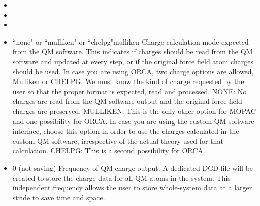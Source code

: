 \begin{itemize}
\item
{}

\item
{}

\item
{}

\item
{}%
{``none" or ``mulliken" or ``chelpg"}{mulliken}{%
Charge calculation mode expected from the QM software. This
indicates if charges should be read from the QM software and
updated at every step, or if the original force field atom
charges should be used. In case you are using ORCA, two charge
options are allowed, Mulliken or CHELPG. We must know the kind
of charge requested by the user so that the proper format is expected,
read and processed. NONE: No charges are read from the QM software
output and the original force field charges are preserved.
MULLIKEN: This is the only other option for MOPAC and one possibility
for ORCA. In case you are using the custom QM software interface,
choose this option in order to use the charges calculated in the
custom QM software, irrespective of the actual theory used for
that calculation. CHELPG: This is a second possibility for ORCA.
}

\item
{}%
{0 (not saving)}{%
Frequency of QM charge output. A dedicated DCD file will be created
to store the charge data for all QM atoms in the system. This
independent frequency allows the user to store whole-system data
at a larger stride to save time and space.
}


\end{itemize}
